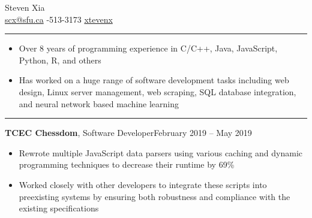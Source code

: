 \documentclass{article}
\newcommand{\entrytitle}[3]{\vspace{0.5em}\textbf{#1}, {\small #2}\hfill #3}
\renewcommand{\section}[1]{\vspace{1em}{\Large #1}\vspace{0.3em}\hrule}
\newenvironment{entrybody}{\begin{itemize}[itemsep=0.3em]}{\end{itemize}}
\begin{document}
\selectfont
\pagestyle{empty}


\begin{center}
    {\huge Steven Xia} \\\vspace{1em}
    \faEnvelope\: \href{mailto:scx@sfu.ca}{scx@sfu.ca} \qquad
    \faPhoneSquare*{}-513-3173 \qquad
    \faGithub\: \href{https://github.com/xtevenx}{xtevenx}
\end{center}\vspace{-1em}


\section{Skills} \vspace{0.5em}

\begin{entrybody}
\item Over 8 years of programming experience in C/C++, Java, JavaScript, Python, R, and others
\item
    Has worked on a huge range of software development tasks including web design, Linux server
    management, web scraping, SQL database integration, and neural network based machine learning
\end{entrybody}


\section{Experience}


\entrytitle{TCEC Chessdom}{Software Developer}{February 2019 – May 2019}
\begin{entrybody}
\item
    Rewrote multiple JavaScript data parsers using various caching and dynamic programming
    techniques to decrease their runtime by 69\%
\item
    Worked closely with other developers to integrate these scripts into preexisting systems by
    ensuring both robustness and compliance with the existing specifications
\end{entrybody}
\end{document}
